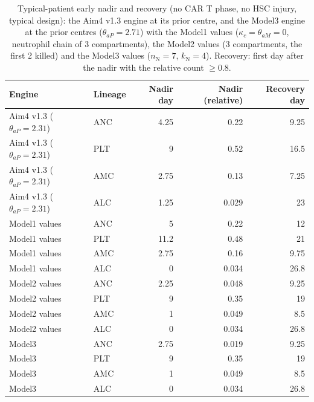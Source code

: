 \begin{table}[!htbp]
\centering
\small
\setlength{\tabcolsep}{3.5pt}
\caption{Typical-patient early nadir and recovery (no CAR T phase, no HSC injury, typical design): the Aim4 v1.3 engine at its prior centre, and the Model3 engine at the prior centres ($\theta_{aP}=2.71$) with the Model1 values ($\kappa_c=\theta_{aM}=0$, neutrophil chain of 3 compartments), the Model2 values (3 compartments, the first 2 killed) and the Model3 values ($n_{\mathrm{N}}=7$, $k_{\mathrm{N}}=4$). Recovery: first day after the nadir with the relative count $\geq 0.8$.}
\label{tab:aim4}
\begin{tabular}{llrrr}
\toprule
Engine & Lineage & Nadir day & Nadir (relative) & Recovery day \\
\midrule
Aim4 v1.3 ($\theta_{aP}=2.31$) & ANC & 4.25 & 0.22 & 9.25 \\
Aim4 v1.3 ($\theta_{aP}=2.31$) & PLT & 9 & 0.52 & 16.5 \\
Aim4 v1.3 ($\theta_{aP}=2.31$) & AMC & 2.75 & 0.13 & 7.25 \\
Aim4 v1.3 ($\theta_{aP}=2.31$) & ALC & 1.25 & 0.029 & 23 \\
Model1 values & ANC & 5 & 0.22 & 12 \\
Model1 values & PLT & 11.2 & 0.48 & 21 \\
Model1 values & AMC & 2.75 & 0.16 & 9.75 \\
Model1 values & ALC & 0 & 0.034 & 26.8 \\
Model2 values & ANC & 2.25 & 0.048 & 9.25 \\
Model2 values & PLT & 9 & 0.35 & 19 \\
Model2 values & AMC & 1 & 0.049 & 8.5 \\
Model2 values & ALC & 0 & 0.034 & 26.8 \\
Model3 & ANC & 2.75 & 0.019 & 9.25 \\
Model3 & PLT & 9 & 0.35 & 19 \\
Model3 & AMC & 1 & 0.049 & 8.5 \\
Model3 & ALC & 0 & 0.034 & 26.8 \\
\bottomrule
\end{tabular}
\end{table}
